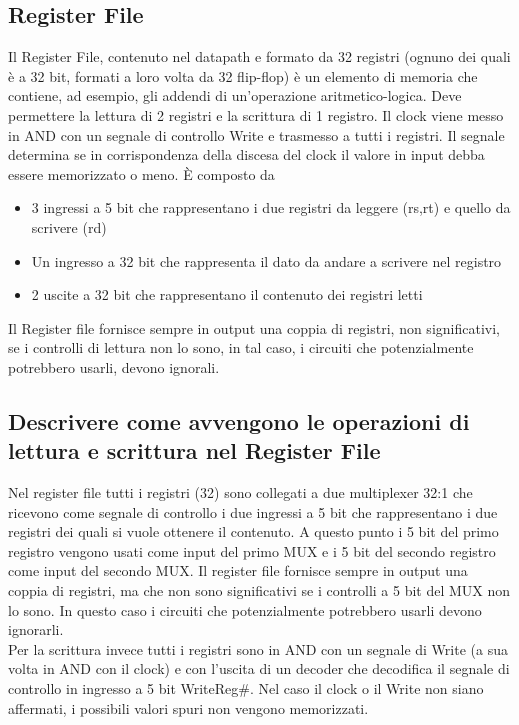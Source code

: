 \documentclass[italian]{article}
\begin{document}
	\subsection{Register File}
	Il Register File, contenuto nel datapath e formato da 32 registri (ognuno dei quali è a 32 bit, formati a loro volta da 32 flip-flop) è un elemento di memoria che contiene, ad esempio, gli addendi di un’operazione aritmetico-logica. Deve permettere la lettura di 2 registri e la scrittura di 1 registro. Il clock viene messo in AND con un segnale di controllo Write e trasmesso a tutti i registri. Il segnale determina se in corrispondenza della discesa del clock il valore in input debba essere memorizzato o meno. È composto da 
	\begin{itemize}[noitemsep]
		\item 3 ingressi a 5 bit che rappresentano i due registri da leggere (rs,rt) e quello da scrivere (rd)
		\item Un ingresso a 32 bit che rappresenta il dato da andare a scrivere nel registro
		\item 2 uscite a 32 bit che rappresentano il contenuto dei registri letti
	\end{itemize}	
	Il Register file fornisce sempre in output una coppia di registri, non significativi, se i controlli di lettura non lo sono, in tal caso, i circuiti che potenzialmente potrebbero usarli, devono ignorali.
	
	\subsection{Descrivere come avvengono le operazioni di lettura e scrittura nel Register File}
	Nel register file tutti i registri (32) sono collegati a due multiplexer 32:1 che ricevono come segnale di controllo i due ingressi a 5 bit che rappresentano i due registri dei quali si vuole ottenere il contenuto. A questo punto i 5 bit del primo registro vengono usati come input del primo MUX e i 5 bit del secondo registro come input del secondo MUX. Il register file fornisce sempre in output una coppia di registri, ma che non sono significativi se i controlli a 5 bit del MUX non lo sono. In questo caso i circuiti che potenzialmente potrebbero usarli devono ignorarli. \\[2mm]
	Per la scrittura invece tutti i registri sono in AND con un segnale di Write (a sua volta in AND con il clock) e con l’uscita di un decoder che decodifica il segnale di controllo in ingresso a 5 bit WriteReg\#. Nel caso il clock o il Write non siano affermati, i possibili valori spuri non vengono memorizzati.
	
\end{document}
